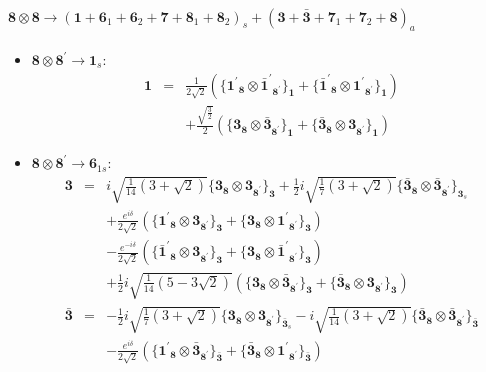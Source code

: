 \documentclass[english]{article}
\newcommand{\subcg}[3]{\big\{ {#1}\otimes{#2}\big\}^{}_{#3}}
\newcommand{\rep}[1]{\mathbf{#1}}
\begin{document}
\paragraph*{\Large $\rep{8}\otimes\rep{8}\to\left(\rep{1}+\rep{6}_{1}+\rep{6}_{2}+\rep{7}+\rep{8}_{1}+\rep{8}_{2}\right)_s+\left(\rep{3}+\rep{\bar{3}}+\rep{7}_{1}+\rep{7}_{2}+\rep{8}\right)_a$}
\begin{itemize}
\item $\rep{8}\otimes\rep{8^{\prime}}\to\rep{1}_{s}$:
\begin{eqnarray*}
\rep{1} &=& \frac{1}{2 \sqrt{2}}\left(\subcg{\rep{1^{\prime}}_{\rep{8}}}{\rep{\bar{1}^{\prime}}_{\rep{8^{\prime}}}}{\rep{1}}+\subcg{\rep{\bar{1}^{\prime}}_{\rep{8}}}{\rep{1^{\prime}}_{\rep{8^{\prime}}}}{\rep{1}}\right) \\ 
 & & +\frac{\sqrt{\frac{3}{2}}}{2}\left(\subcg{\rep{3}_{\rep{8}}}{\rep{\bar{3}}_{\rep{8^{\prime}}}}{\rep{1}}+\subcg{\rep{\bar{3}}_{\rep{8}}}{\rep{3}_{\rep{8^{\prime}}}}{\rep{1}}\right)
\end{eqnarray*}
\item $\rep{8}\otimes\rep{8^{\prime}}\to\rep{6}_{1s}$:
\begin{eqnarray*}
\rep{3} &=& i \sqrt{\frac{1}{14} \left(3+\sqrt{2}\right)}\subcg{\rep{3}_{\rep{8}}}{\rep{3}_{\rep{8^{\prime}}}}{\rep{3}}+\frac{1}{2} i \sqrt{\frac{1}{7} \left(3+\sqrt{2}\right)}\subcg{\rep{\bar{3}}_{\rep{8}}}{\rep{\bar{3}}_{\rep{8^{\prime}}}}{\rep{3}_{s}} \\ 
 & & +\frac{e^{i \delta }}{2 \sqrt{2}}\left(\subcg{\rep{1^{\prime}}_{\rep{8}}}{\rep{3}_{\rep{8^{\prime}}}}{\rep{3}}+\subcg{\rep{3}_{\rep{8}}}{\rep{1^{\prime}}_{\rep{8^{\prime}}}}{\rep{3}}\right) \\ 
 & & -\frac{e^{-i \delta }}{2 \sqrt{2}}\left(\subcg{\rep{\bar{1}^{\prime}}_{\rep{8}}}{\rep{3}_{\rep{8^{\prime}}}}{\rep{3}}+\subcg{\rep{3}_{\rep{8}}}{\rep{\bar{1}^{\prime}}_{\rep{8^{\prime}}}}{\rep{3}}\right) \\ 
 & & +\frac{1}{2} i \sqrt{\frac{1}{14} \left(5-3 \sqrt{2}\right)}\left(\subcg{\rep{3}_{\rep{8}}}{\rep{\bar{3}}_{\rep{8^{\prime}}}}{\rep{3}}+\subcg{\rep{\bar{3}}_{\rep{8}}}{\rep{3}_{\rep{8^{\prime}}}}{\rep{3}}\right)
\\
\rep{\bar{3}} &=& -\frac{1}{2} i \sqrt{\frac{1}{7} \left(3+\sqrt{2}\right)}\subcg{\rep{3}_{\rep{8}}}{\rep{3}_{\rep{8^{\prime}}}}{\rep{\bar{3}}_{s}}-i \sqrt{\frac{1}{14} \left(3+\sqrt{2}\right)}\subcg{\rep{\bar{3}}_{\rep{8}}}{\rep{\bar{3}}_{\rep{8^{\prime}}}}{\rep{\bar{3}}} \\ 
 & & -\frac{e^{i \delta }}{2 \sqrt{2}}\left(\subcg{\rep{1^{\prime}}_{\rep{8}}}{\rep{\bar{3}}_{\rep{8^{\prime}}}}{\rep{\bar{3}}}+\subcg{\rep{\bar{3}}_{\rep{8}}}{\rep{1^{\prime}}_{\rep{8^{\prime}}}}{\rep{\bar{3}}}\right) \\ 

\end{eqnarray*}
\end{itemize}
\end{document}
